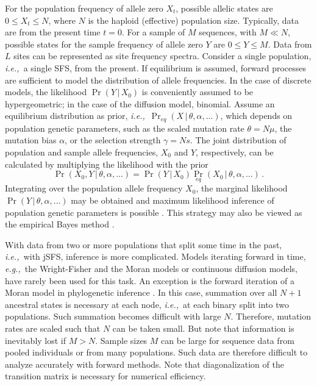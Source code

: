 \documentclass[preprint]{elsarticle}
\newcommand\given{{\,|\,}}
\newcommand\eg{{\it e.g.,}}
\newcommand\ie{{\it i.e.,}}
\begin{document}
For the population frequency of allele zero $X_t$, possible allelic states are $0\leq X_t \leq N$, where $N$ is the haploid (effective) population size. Typically, data are from the present time $t=0$. For a sample of $M$ sequences, with $M\ll N$, possible states for the sample frequency of allele zero $Y$ are $0\leq Y \leq M$. Data from $L$ sites can be represented as site frequency spectra. Consider a single population, \ie\ a single SFS, from the present. If equilibrium is assumed, forward processes are sufficient to model the distribution of allele frequencies. In the case of discrete models, the likelihood $\Pr(Y\given X_0)$ is conveniently assumed to be hypergeometric; in the case of the diffusion model, binomial. Assume an equilibrium %
distribution as prior, \ie\ $\Pr_{eq}(X\given \theta,\alpha,\dots)$, which depends on population genetic parameters, such as the scaled mutation rate $\theta=N\mu$, the mutation bias $\alpha$, or the selection strength $\gamma=Ns$. The joint distribution of population and sample allele frequencies, $X_0$ and $Y$, respectively, can be calculated by multiplying the likelihood with the prior
\begin{equation}
 \Pr(X_0,Y\given \theta,\alpha,\dots)=\Pr(Y\given X_0){\Pr}_{eq} (X_{0}\given \theta,\alpha,\dots)\,.
\end{equation}
Integrating over the population allele frequency $X_0$, the marginal likelihood $\Pr(Y\given \theta,\alpha,\dots)$ may be obtained and maximum likelihood inference of population genetic parameters is possible \citep{Vogl14b,Vogl15}. This strategy may also be viewed as the empirical Bayes method \citep[\eg][]{Carl00}.

With data from two or more populations that split some time in the past, \ie\ with jSFS, inference is more complicated. Models iterating forward in time, \eg\ the Wright-Fisher and the Moran models or continuous diffusion models, have rarely been used for this task. An exception is the forward iteration of a Moran model in phylogenetic inference \citep{Schrempf2016}. In this case, summation over all $N+1$ ancestral states is necessary at each node, \ie\ at each binary split into two populations. Such summation becomes difficult with large $N$. Therefore, mutation rates are scaled such that $N$ can be taken small.  But note that information is inevitably lost if $M>N$. Sample sizes $M$ can be large for sequence data from pooled individuals or from many populations. Such data are therefore difficult to analyze accurately with forward methods. Note that diagonalization of the transition matrix is necessary for numerical efficiency. 
\end{document}
